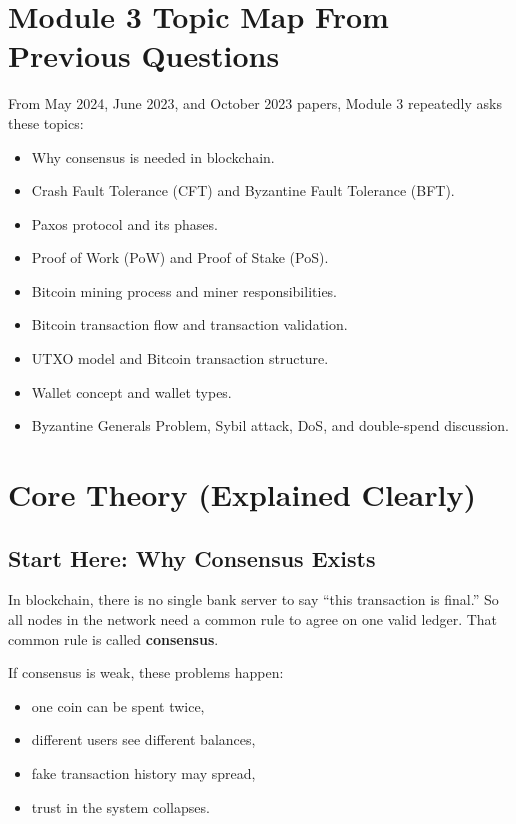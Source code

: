\documentclass[12pt,a4paper]{article}
\begin{document}
\section{Module 3 Topic Map From Previous Questions}

From May 2024, June 2023, and October 2023 papers, Module 3 repeatedly asks these topics:

\begin{itemize}
\item Why consensus is needed in blockchain.
\item Crash Fault Tolerance (CFT) and Byzantine Fault Tolerance (BFT).
\item Paxos protocol and its phases.
\item Proof of Work (PoW) and Proof of Stake (PoS).
\item Bitcoin mining process and miner responsibilities.
\item Bitcoin transaction flow and transaction validation.
\item UTXO model and Bitcoin transaction structure.
\item Wallet concept and wallet types.
\item Byzantine Generals Problem, Sybil attack, DoS, and double-spend discussion.
\end{itemize}

\section{Core Theory (Explained Clearly)}

\subsection{Start Here: Why Consensus Exists}
In blockchain, there is no single bank server to say ``this transaction is final.''
So all nodes in the network need a common rule to agree on one valid ledger.
That common rule is called \textbf{consensus}.

If consensus is weak, these problems happen:
\begin{itemize}
\item one coin can be spent twice,
\item different users see different balances,
\item fake transaction history may spread,
\item trust in the system collapses.
\end{itemize}
\end{document}

